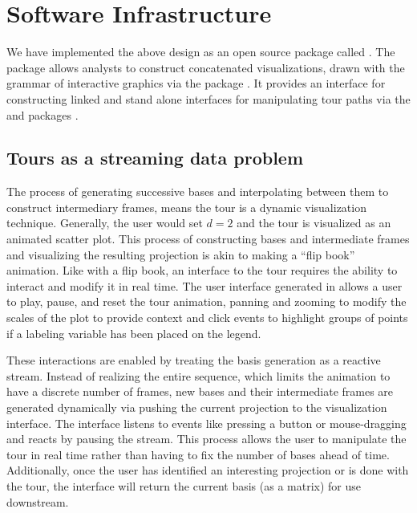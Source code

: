 \documentclass[article,notitle]{jdssv}
\begin{document}
\hypertarget{software-infrastructure}{%
\section{Software Infrastructure}\label{software-infrastructure}}

We have implemented the above design as an open source  package called
 \citep{r-liminal}. The package allows analysts to construct concatenated
visualizations, drawn with the  grammar of interactive graphics via
the  package \citep{Satyanarayan2017-gs, Lyttle2020-hp}. It provides
an interface for constructing linked and stand alone interfaces for
manipulating tour paths via the  and  packages
\citep{Chang2020-bq, Wickham2011-st}.

\hypertarget{tours-as-a-streaming-data-problem}{%
\subsection{Tours as a streaming data problem}\label{tours-as-a-streaming-data-problem}}

The process of generating successive bases and interpolating between them to\\
construct intermediary frames, means the tour is a dynamic visualization
technique. Generally, the user would set \(d=2\) and the tour is visualized as
an animated scatter plot. This process of constructing bases and intermediate
frames and visualizing the resulting projection is akin to making a ``flip book''
animation. Like with a flip book, an interface to the tour requires the ability
to interact and modify it in real time. The user interface generated in 
allows a user to play, pause, and reset the tour animation,
panning and zooming to modify the scales of the plot to provide context and
click events to highlight groups of points if a labeling variable has
been placed on the legend.

These interactions are enabled by treating the basis generation as a reactive
stream. Instead of realizing the entire sequence, which limits the animation
to have a discrete number of frames, new bases and their intermediate frames
are generated dynamically via pushing the current projection to the
visualization interface. The interface listens to events like pressing a button
or mouse-dragging and reacts by pausing the stream. This process allows the
user to manipulate the tour in real time rather than having to fix the number
of bases ahead of time. Additionally, once the user has identified an
interesting projection or is done with the tour, the interface will return the
current basis (as a matrix) for use downstream.
\end{document}
